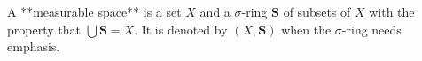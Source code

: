A **measurable space** is a set $X$ and a $\sigma$-ring $\mathbf{S}$ of subsets of $X$ with the property that $\bigcup \mathbf{S} = X$. It is denoted by $(X,\mathbf{S})$ when the $\sigma$-ring needs emphasis.
